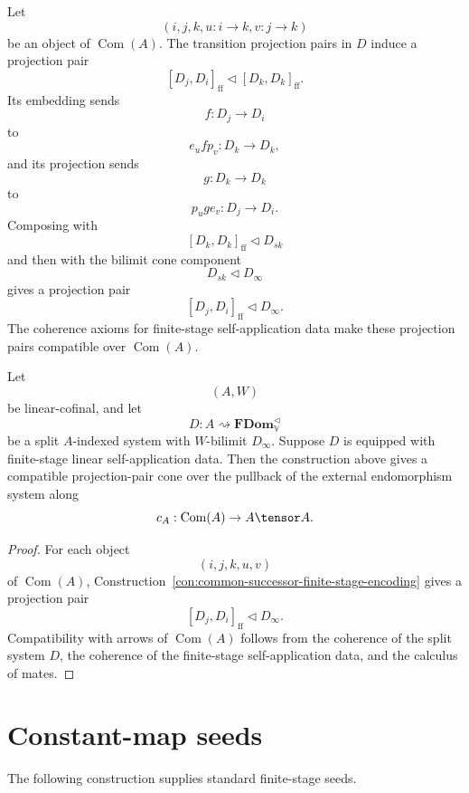 \begin{construction}
\label{con:common-successor-finite-stage-encoding}
Let
\[
    (i,j,k,u:i\to k,v:j\to k)
\]
be an object of \(\operatorname{Com}(A)\).  The transition projection pairs in
\(D\) induce a projection pair
\[
    [D_j,D_i]_{\mathrm{ff}}
    \triangleleft
    [D_k,D_k]_{\mathrm{ff}}.
\]
Its embedding sends
\[
    f:D_j\to D_i
\]
to
\[
    e_u f p_v:D_k\to D_k,
\]
and its projection sends
\[
    g:D_k\to D_k
\]
to
\[
    p_u g e_v:D_j\to D_i.
\]
Composing with
\[
    [D_k,D_k]_{\mathrm{ff}}
    \triangleleft
    D_{sk}
\]
and then with the bilimit cone component
\[
    D_{sk}\triangleleft D_\infty
\]
gives a projection pair
\[
    [D_j,D_i]_{\mathrm{ff}}
    \triangleleft
    D_\infty.
\]
The coherence axioms for finite-stage self-application data make these
projection pairs compatible over \(\operatorname{Com}(A)\).
\end{construction}

\begin{theorem}
\label{thm:common-successor-encodings-over-com}
Let
\[
    (A,W)
\]
be linear-cofinal, and let
\[
    D:A\rightsquigarrow\mathbf{FDom}_{\mathbb V}^{\triangleleft}
\]
be a split \(A\)-indexed system with \(W\)-bilimit \(D_\infty\).  Suppose \(D\)
is equipped with finite-stage linear self-application data.  Then the
construction above gives a compatible projection-pair cone over the pullback of
the external endomorphism system along
\[
    c_A:\operatorname{Com}(A)\to A\tensor A.
\]
\end{theorem}

\begin{proof}
For each object
\[
    (i,j,k,u,v)
\]
of \(\operatorname{Com}(A)\), Construction~\ref{con:common-successor-finite-stage-encoding}
gives a projection pair
\[
    [D_j,D_i]_{\mathrm{ff}}\triangleleft D_\infty.
\]
Compatibility with arrows of \(\operatorname{Com}(A)\) follows from the
coherence of the split system \(D\), the coherence of the finite-stage
self-application data, and the calculus of mates.
\end{proof}

\section{Constant-map seeds}
\label{sec:constant-map-seeds-ff}

The following construction supplies standard finite-stage seeds.

